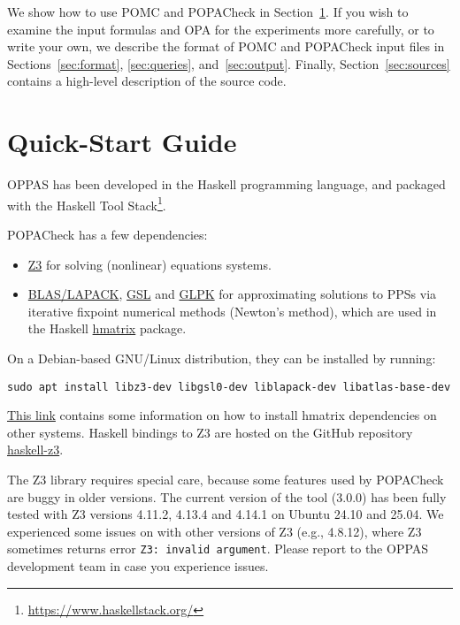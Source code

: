 \documentclass[9pt,a4paper]{article}
\begin{document}
We show how to use POMC and POPACheck in Section~\ref{sec:quick-start}.
If you wish to examine the input formulas and OPA for the experiments more carefully,
or to write your own, we describe the format of POMC and POPACheck input files in Sections~\ref{sec:format}, \ref{sec:queries}, and~\ref{sec:output}.
Finally, Section~\ref{sec:sources} contains a high-level description of the source code.


\section{Quick-Start Guide}
\label{sec:quick-start}

OPPAS has been developed in the Haskell programming language,
and packaged with the Haskell Tool Stack\footnote{\url{https://www.haskellstack.org/}}.

POPACheck has a few dependencies:
\begin{itemize}
    \item \href{https://microsoft.github.io/z3guide/z3}{Z3} for solving (nonlinear) equations systems.
    \item \href{https://www.netlib.org/lapack/}{BLAS/LAPACK}, \href{ttps://www.gnu.org/software/gsl/}{GSL} and \href{https://www.gnu.org/software/glpk/}{GLPK} for approximating solutions to PPSs via iterative fixpoint numerical methods (Newton's method), which are used in the Haskell \href{https://hackage.haskell.org/package/hmatrix}{hmatrix} package.
\end{itemize}
On a Debian-based GNU/Linux distribution, they can be installed by running:
\begin{verbatim}
sudo apt install libz3-dev libgsl0-dev liblapack-dev libatlas-base-dev
\end{verbatim}

\href{https://github.com/haskell-numerics/hmatrix/blob/master/INSTALL.md}{This link} contains some information on how to install hmatrix dependencies on other systems.
Haskell bindings to Z3 are hosted on the GitHub repository \href{https://github.com/michiari/haskell-z3}{haskell-z3}.

The Z3 library requires special care, because some features used by POPACheck are buggy in older versions.
The current version of the tool (3.0.0) has been fully tested with Z3 versions 4.11.2, 4.13.4 and 4.14.1 on Ubuntu 24.10 and 25.04.
We experienced some issues on with other versions of Z3 (e.g., 4.8.12), where Z3 sometimes returns error \verb|Z3: invalid argument|.
Please report to the OPPAS development team in case you experience issues.
\end{document}

